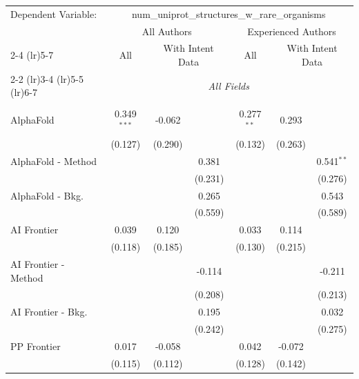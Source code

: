 \begingroup
\centering
\begin{tabular}{lcccccc}
   \tabularnewline \midrule \midrule
   Dependent Variable: & \multicolumn{6}{c}{num\_uniprot\_structures\_w\_rare\_organisms}\\
 & \multicolumn{3}{c}{All Authors} & \multicolumn{3}{c}{Experienced Authors} \\
\cmidrule(lr){2-4} \cmidrule(lr){5-7}
 & \multicolumn{1}{c}{All} & \multicolumn{2}{c}{With Intent Data} & \multicolumn{1}{c}{All} & \multicolumn{2}{c}{With Intent Data} \\
\cmidrule(lr){2-2} \cmidrule(lr){3-4} \cmidrule(lr){5-5} \cmidrule(lr){6-7}
 & \multicolumn{6}{c}{\textit{All Fields}} \\ \\
   AlphaFold            & 0.349$^{***}$ & -0.062  &         & 0.277$^{**}$ & 0.293   &   \\   
                        & (0.127)       & (0.290) &         & (0.132)      & (0.263) &   \\   
   AlphaFold - Method   &               &         & 0.381   &              &         & 0.541$^{**}$\\   
                        &               &         & (0.231) &              &         & (0.276)\\   
   AlphaFold - Bkg.     &               &         & 0.265   &              &         & 0.543\\   
                        &               &         & (0.559) &              &         & (0.589)\\   
   AI Frontier          & 0.039         & 0.120   &         & 0.033        & 0.114   &   \\   
                        & (0.118)       & (0.185) &         & (0.130)      & (0.215) &   \\   
   AI Frontier - Method &               &         & -0.114  &              &         & -0.211\\   
                        &               &         & (0.208) &              &         & (0.213)\\   
   AI Frontier - Bkg.   &               &         & 0.195   &              &         & 0.032\\   
                        &               &         & (0.242) &              &         & (0.275)\\   
   PP Frontier          & 0.017         & -0.058  &         & 0.042        & -0.072  &   \\   
                        & (0.115)       & (0.112) &         & (0.128)      & (0.142) &   \\   

\end{tabular}
